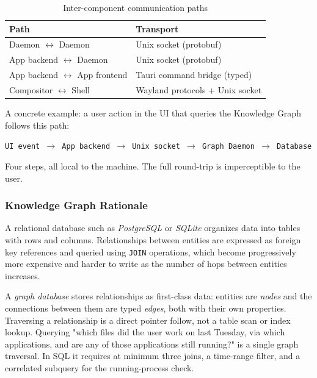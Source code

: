 \begin{table}[htbp]
\caption{Inter-component communication paths}
\label{tab:comms}
\begin{tabularx}{\linewidth}{lX}
\toprule
\textbf{Path} & \textbf{Transport} \\
\midrule
Daemon $\leftrightarrow$ Daemon            & Unix socket (protobuf) \\
App backend $\leftrightarrow$ Daemon       & Unix socket (protobuf) \\
App backend $\leftrightarrow$ App frontend & Tauri command bridge (typed) \\
Compositor $\leftrightarrow$ Shell         & Wayland protocols + Unix socket \\
\bottomrule
\end{tabularx}
\end{table}

A concrete example: a user action in the UI that queries the Knowledge Graph
follows this path:

\begin{center}
\texttt{UI event $\to$ App backend $\to$ Unix socket $\to$ Graph Daemon $\to$ Database}
\end{center}

Four steps, all local to the machine. The full round-trip is imperceptible to
the user.

\subsubsection{Knowledge Graph Rationale}
\label{sec:kg-rationale}

A relational database such as \emph{PostgreSQL} or \emph{SQLite} organizes data
into tables with rows and columns. Relationships between entities are expressed
as foreign key references and queried using \texttt{JOIN} operations, which
become progressively more expensive and harder to write as the number of hops
between entities increases.

A \emph{graph database} stores relationships as first-class data: entities are
\emph{nodes} and the connections between them are typed \emph{edges}, both with
their own properties. Traversing a relationship is a direct pointer follow,
not a table scan or index lookup. Querying "which files did the user work on
last Tuesday, via which applications, and are any of those applications still
running?" is a single graph traversal. In SQL it requires at minimum three joins,
a time-range filter, and a correlated subquery for the running-process check.

